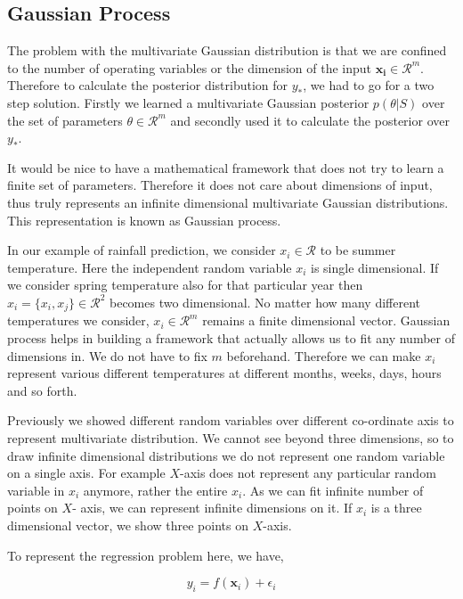 \documentclass[english]{tktltiki}
\begin{document}
\subsection{Gaussian Process}

The problem with the multivariate Gaussian distribution is that we are confined to the number of operating variables or the dimension of the input $\mathbf{x_i} \in \mathcal{R}^m$. Therefore to calculate the posterior distribution for $y_*$, we had to go for a two step solution. Firstly we learned a multivariate Gaussian posterior $p(\theta | S)$ over the set of parameters $\theta \in \mathcal{R}^m$ and secondly used it to calculate the posterior over $y_*$.

It would be nice to have a mathematical framework that does not try to learn a finite set of parameters. Therefore it does not care about dimensions of input, thus truly represents an infinite dimensional multivariate Gaussian distributions. This representation is known as Gaussian process.

In our example of rainfall prediction, we consider $x_i \in \mathcal{R}$ to be summer temperature. Here the independent random variable $x_i$ is single dimensional. If we consider spring temperature also for that particular year then $x_i = \{x_i, x_j\} \in \mathcal{R}^2$ becomes two dimensional. No matter how many different temperatures we consider, $x_i \in \mathcal{R}^m$ remains a finite dimensional vector. Gaussian process helps in building a framework that actually allows us to fit any number of dimensions in. We do not have to fix $m$ beforehand. Therefore we can make $x_i$ represent various different temperatures at different months, weeks, days, hours and so forth.

Previously we showed different random variables over different co-ordinate axis to represent multivariate distribution. We cannot see beyond three dimensions, so to draw infinite dimensional distributions we do not represent one random variable on a single axis. For example $X$-axis does not represent any particular random variable in $x_i$ anymore, rather the entire $x_i$. As we can fit infinite number of points on $X$- axis, we can represent infinite dimensions on it. If $x_i$ is a three dimensional vector, we show three points on $X$-axis.

To represent the regression problem here, we have,

\begin{equation}
y_i = f(\mathbf{x}_i) + \epsilon_i
\end{equation}
\end{document}
